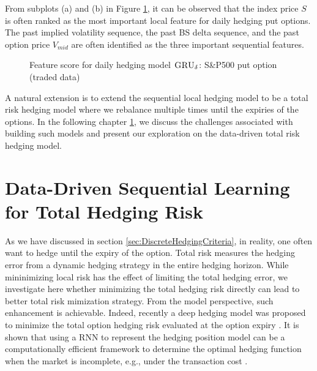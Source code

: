 \documentclass[letterpaper,12pt,titlepage,oneside,final]{book}
\numberwithin{equation}{section}
\theoremstyle{definition}
\newcommand{\model}{\textsc{GRU}_\delta}
\begin{document}
From subplots (a) and (b) in Figure \ref{fig:put1daily}, it can be observed that the index price $S$ is often ranked as the most important local feature for daily hedging put options. The past implied volatility sequence, the past  BS delta sequence, and the past option price $V_{mid}$  are often identified as the three important sequential features.
\begin{figure}[htp]
\centering
{}
\caption{Feature score for daily hedging model $\model$:  S\&P500 put option (traded data)} \label{fig:put1daily}
\end{figure}
A natural extension  is to extend the sequential local hedging model to be a total risk hedging model where we rebalance multiple times until the expiries of the options. In the following chapter \ref{sec:RNNTotal}, we discuss the challenges associated with building such models and present our exploration on the data-driven total risk hedging model.


\chapter{Data-Driven Sequential Learning  for Total Hedging Risk}
\label{sec:RNNTotal}
As we have discussed in section \ref{sec:DiscreteHedgingCriteria}, in reality, one often want to hedge until the expiry of the option. Total risk measures the hedging error from a dynamic hedging strategy in the entire hedging horizon. While mininimizing local risk has the effect of limiting the total hedging error, we investigate here whether minimizing the total hedging risk directly can lead to better total risk mimization strategy. From the model perspective, such enhancement is achievable. Indeed, recently a deep hedging model was proposed to minimize the total option hedging risk evaluated at the option expiry  \citep{buehler2019deep}. It is shown  that using a RNN to represent the hedging position model can be a computationally efficient framework to determine the optimal hedging function when the market is incomplete, e.g., under the transaction cost \citep{buehler2019deep}.
\end{document}
